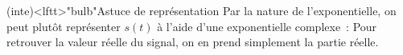 \documentclass[../../main/main.tex]{subfiles}
\begin{document}
\begin{tcb}[sidebyside, righthand ratio=.3]
  (inte)<lftt>"bulb"{Astuce de représentation}
	Par la nature de l'exponentielle, on peut plutôt représenter $s(t)$ à l'aide
	d'une exponentielle complexe~:
	\psw{%
		\[
			\boxed{\xul{s}(t) = A \exr^{\jj(\wt+\f_0)}}
		\]
	}%
	Pour retrouver la valeur réelle du signal, on en prend simplement la partie
	réelle.
	\tcblower
	\begin{center}
    \vspace{-15pt}
	\end{center}
\end{tcb}
\end{document}
